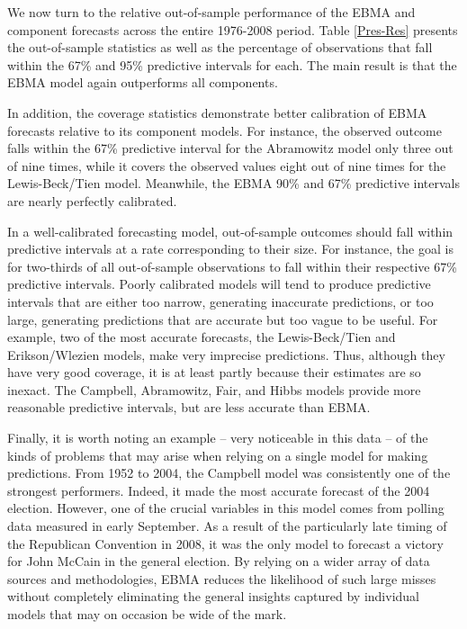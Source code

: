 \documentclass[pdftex,12pt,fullpage,oneside]{amsart}
\begin{document}
We now turn to the relative out-of-sample performance of the EBMA and
component forecasts across the entire 1976-2008 period.  Table
\ref{Pres-Res} presents the out-of-sample statistics as well as the
percentage of observations that fall within the 67\% and 95\%
predictive intervals for each.  The main result is that the EBMA model
again outperforms all components.




 In addition, the coverage statistics demonstrate better calibration
 of EBMA forecasts relative to its component models.  For instance,
 the observed outcome falls within the 67\% predictive interval for
 the Abramowitz model only three out of nine times, while it covers the
 observed values eight out of nine times for the Lewis-Beck/Tien
 model.  Meanwhile, the EBMA 90\% and 67\% predictive intervals are
 nearly perfectly calibrated.

 In a well-calibrated forecasting model, out-of-sample outcomes should
 fall within predictive intervals at a rate corresponding to their
 size.  For instance, the goal is for two-thirds of all out-of-sample
 observations to fall within their respective 67\% predictive
 intervals.  Poorly calibrated models will tend to produce predictive
 intervals that are either too narrow, generating inaccurate
 predictions, or too large, generating predictions that are accurate
 but too vague to be useful. For example, two of the most accurate
 forecasts, the Lewis-Beck/Tien and Erikson/Wlezien models, make very
 imprecise predictions.  Thus, although they have very good coverage,
 it is at least partly because their estimates are so inexact.  The
 Campbell, Abramowitz, Fair, and Hibbs models provide more reasonable
 predictive intervals, but are less accurate than EBMA.


 Finally, it is worth noting an example -- very noticeable in this
 data -- of the kinds of problems that may arise when relying on a
 single model for making predictions.  From 1952 to 2004, the Campbell
 model was consistently one of the strongest performers.  Indeed, it
 made the most accurate forecast of the 2004 election.  However, one
 of the crucial variables in this model comes from polling data
 measured in early September.  As a result of the particularly late
 timing of the Republican Convention in 2008, it was the only model to
 forecast a victory for John McCain in the general election.  By
 relying on a wider array of data sources and methodologies, EBMA
 reduces the likelihood of such large misses without completely
 eliminating the general insights captured by individual models that
 may on occasion be wide of the mark.
\end{document}
